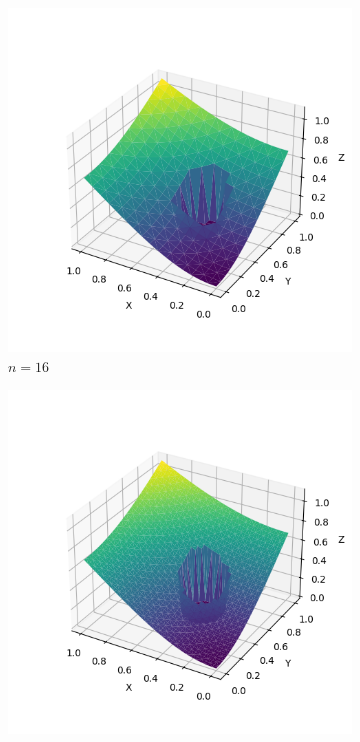 \documentclass[lang=cn,a4paper,newtx,bibend=bibtex]{elegantpaper}
\begin{document}
\begin{figure}[H]
\begin{subfigure}[b]{0.18\textwidth}
      \includegraphics[width=\textwidth]{../../res_bac/res-[data|3-Dirichlet-irregular-b16].png}
      \caption{$n= 16$}
  \end{subfigure}
  \hfill
  \begin{subfigure}[b]{0.18\textwidth}
      \includegraphics[width=\textwidth]{../../res_bac/res-[data|3-Dirichlet-irregular-c32].png}

\end{subfigure}
\end{figure}
\end{document}
